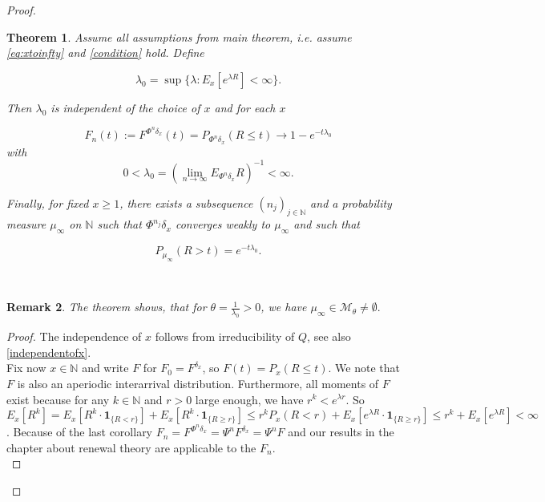 \documentclass[12pt,a4paper]{scrartcl}
\newtheorem{theorem}{Theorem}[section]
\newtheorem {remark}[theorem]{Remark}
\numberwithin{equation}{section}
\newcommand{\N}{\mathbb{N}} %
\begin{document}
\begin{proof}
\begin{theorem} \label{theoremfourone}
Assume all assumptions from main theorem, i.e. assume \eqref{eq:xtoinfty} and \eqref{condition} hold.  Define

\begin{equation}
\lambda_0 = \sup \lbrace  \lambda : E_x\left[e^{\lambda R}\right] < \infty \rbrace. 
\end{equation}

Then $\lambda_0$ is independent of the choice of $x$ and for each $x$

$$ F_n\left(t\right) := F^{\Phi^n\delta_x}\left(t\right) = P_{\Phi^n\delta_x}\left(R \leq t\right) \to 1 - e^{-t\lambda_0} $$
with
\begin{equation} \label{eq:limitforlambdazero}
0 < \lambda_0 = \left(\lim_{n \to \infty} E_{\Phi^n\delta_x}R\right)^{-1} < \infty.
\end{equation}

Finally, for fixed $ x \geq 1 $, there exists a subsequence $ \left(n_j\right)_{j \in \N} $ and a probability measure $\mu_{\infty}$ on $\N$ such that $\Phi^{n_j}\delta_x$ converges weakly to $\mu_{\infty}$ and such that

\begin{equation}
\label{eq:existenceofmuinfty}
P_{\mu_{\infty}}\left(R>t\right) = e^{-t\lambda_0}.
\end{equation}

\end{theorem} \\[2ex]

\begin{remark}
The theorem shows, that for $\theta = \frac{1}{\lambda_0} > 0$, we have $\mu_{\infty} \in \mathcal{M}_{\theta} \neq \emptyset.$
\end{remark}

\begin{proof}
The independence of $x$ follows from irreducibility of $ Q $, see also \eqref{independentofx}.\\[0.3ex]

Fix now $x \in \N$ and write $F$ for $ F_0 = F^{\delta_x}$, so $ F\left(t\right) = P_x\left(R \leq t\right)$. 
We note that $ F $ is also an aperiodic interarrival distribution. Furthermore, all moments of $F$ exist because for any $ k \in \N $ and $ r > 0 $ large enough, we have $r^k < e^{\lambda r}$. So $E_x\left[R^k\right] = E_x\left[R^k \cdot \textbf{1}_{\lbrace R < r\rbrace }\right] + E_x\left[R^k \cdot \textbf{1}_{\lbrace R \geq r\rbrace }\right] \leq r^k  P_x\left(R < r\right) + E_x\left[e^{\lambda R}\cdot \textbf{1}_{\lbrace R \geq r\rbrace }\right] \leq r^k + E_x\left[e^{\lambda R}\right] < \infty $.
Because of the last corollary $ F_n = F^{\Phi^n \delta_x} = \Psi^n F^{\delta_x} = \Psi^n F $ and our results in the chapter about renewal theory are applicable to the $F_n$. \\[2ex]


\end{proof}
\end{proof}
\end{document}
